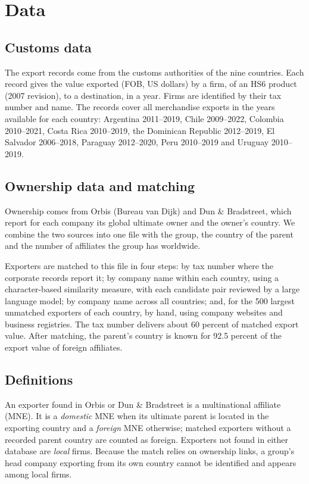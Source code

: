 \documentclass[11pt,a4paper]{article}
\begin{document}
\section{Data}\label{sec:data}
\subsection{Customs data}

The export records come from the customs authorities of the nine countries. Each record gives the
value exported (FOB, US dollars) by a firm, of an HS6 product (2007 revision), to a destination, in
a year. Firms are identified by their tax number and name. The records cover all merchandise
exports in the years available for each country: Argentina 2011--2019, Chile 2009--2022, Colombia
2010--2021, Costa Rica 2010--2019, the Dominican Republic 2012--2019, El Salvador 2006--2018,
Paraguay 2012--2020, Peru 2010--2019 and Uruguay 2010--2019.

\subsection{Ownership data and matching}

Ownership comes from Orbis (Bureau van Dijk) and Dun \& Bradstreet, which report for each company
its global ultimate owner and the owner's country. We combine the two sources into one file with
the group, the country of the parent and the number of affiliates the group has worldwide.

Exporters are matched to this file in four steps: by tax number where the corporate records
report it; by company name within each country, using a character-based similarity measure,
with each candidate pair reviewed by a large language model; by company name across all countries; and, for the 500
largest unmatched exporters of each country, by hand, using company websites and business
registries. The tax number delivers about 60 percent of matched export value. After matching, the
parent's country is known for 92.5 percent of the export value of foreign affiliates.

\subsection{Definitions}

An exporter found in Orbis or Dun \& Bradstreet is a multinational affiliate (MNE). It is a
\emph{domestic} MNE when its ultimate parent is located in the exporting country and a
\emph{foreign} MNE otherwise; matched exporters without a recorded parent country are counted as
foreign. Exporters not found in either database are \emph{local} firms. Because the match relies
on ownership links, a group's head company exporting from its own country cannot be identified
and appears among local firms.
\end{document}
